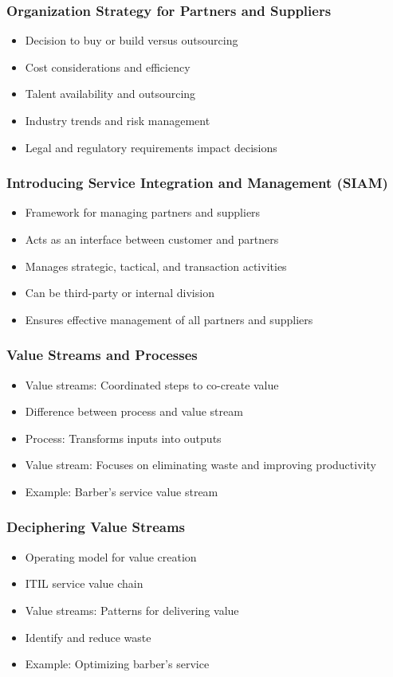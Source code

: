 \documentclass[aspectratio=169, table]{beamer}
\begin{document}
\begin{frame}
	\frametitle{Organization Strategy for Partners and Suppliers}
	\begin{itemize}
		\item Decision to buy or build versus outsourcing
		\item Cost considerations and efficiency
		\item Talent availability and outsourcing
		\item Industry trends and risk management
		\item Legal and regulatory requirements impact decisions
	\end{itemize}
\end{frame}

\begin{frame}
	\frametitle{Introducing Service Integration and Management (SIAM)}
	\begin{itemize}
		\item Framework for managing partners and suppliers
		\item Acts as an interface between customer and partners
		\item Manages strategic, tactical, and transaction activities
		\item Can be third-party or internal division
		\item Ensures effective management of all partners and suppliers
	\end{itemize}
\end{frame}

\begin{frame}
	\frametitle{Value Streams and Processes}
	\begin{itemize}
		\item Value streams: Coordinated steps to co-create value
		\item Difference between process and value stream
		\item Process: Transforms inputs into outputs
		\item Value stream: Focuses on eliminating waste and improving productivity
		\item Example: Barber’s service value stream
	\end{itemize}
\end{frame}

\begin{frame}
	\frametitle{Deciphering Value Streams}
	\begin{itemize}
		\item Operating model for value creation
		\item ITIL service value chain
		\item Value streams: Patterns for delivering value
		\item Identify and reduce waste
		\item Example: Optimizing barber's service
	\end{itemize}
\end{frame}
\end{document}
